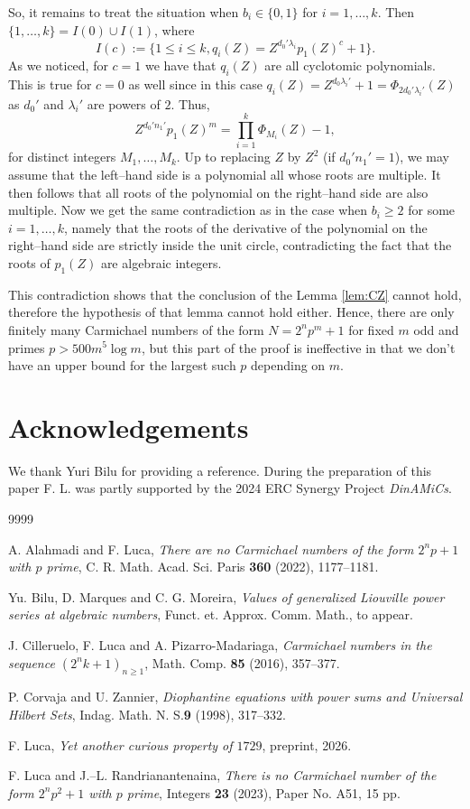 \documentclass[11pt]{article}
\begin{document}
So, it remains to treat the situation when $b_i\in \{0,1\}$ for $i=1,\ldots,k$. Then $\{1,\ldots,k\}=I(0)\cup I(1)$, where 
$$
I(c):=\{1\le i\le k, q_i(Z)=Z^{d_0'\lambda_i} p_1(Z)^c+1\}.
$$ 
As we noticed, for $c=1$ we have that $q_i(Z)$ are all cyclotomic polynomials. This is true for $c=0$ as well since in this case $q_i(Z)=Z^{d_0\lambda_i'}+1=\Phi_{2d_0'\lambda_i'}(Z)$ as $d_0'$ and $\lambda_i'$ are powers of $2$. 
Thus, 
$$
Z^{d_0'n_1'}p_1(Z)^m=\prod_{i=1}^k \Phi_{M_i}(Z)-1,
$$
for distinct integers $M_1,\ldots,M_k$. Up to replacing $Z$ by $Z^2$ (if $d_0'n_1'=1$), we may assume that the left--hand side is a polynomial all whose roots are multiple. It then follows that all roots of the polynomial 
on the right--hand side are also multiple. Now we get the same contradiction as in  the case when $b_i\ge 2$ for some $i=1,\ldots,k$, namely that the roots of the derivative of the polynomial on the right--hand side are strictly inside the unit circle, contradicting the fact that the roots of $p_1(Z)$ are algebraic integers. 

This contradiction shows that the  conclusion of the Lemma \ref{lem:CZ} cannot hold, therefore the hypothesis of that lemma cannot hold either. Hence, there are only finitely many Carmichael numbers of the form $N=2^np^m+1$ for fixed $m$ odd and primes $p>500 m^5\log m$, but this part of the proof is ineffective in that we don't have an upper bound for the largest such $p$ depending on $m$.


\section{Acknowledgements}

We thank Yuri Bilu for providing a reference. During the preparation of this paper F. L. was partly supported by the 2024 ERC Synergy Project {\it DinAMiCs}. 


\begin{thebibliography}{9999}

  A. Alahmadi and F.  Luca, {\it There are no Carmichael numbers of the form $2^np+1$ with $p$ prime}, C. R. Math. Acad. Sci. Paris {\bf 360} (2022), 1177--1181.

 Yu. Bilu, D. Marques and C. G. Moreira, {\it Values of generalized Liouville power series at algebraic numbers}, Funct. et. Approx. Comm. Math., to appear. 

 J. Cilleruelo, F. Luca and A. Pizarro-Madariaga, {\it Carmichael numbers in the sequence $(2^nk+1)_{n\ge 1}$}, Math. Comp. {\bf 85} (2016),  357--377. 

 P. Corvaja and U. Zannier, {\it Diophantine equations with power sums and
Universal Hilbert Sets}, Indag. Math. N. S.{\bf 9} (1998), 317--332.

 F. Luca, {\it Yet another curious property of $1729$}, preprint, 2026. 

 F.  Luca and J.--L. Randrianantenaina, {\it There is no Carmichael number of the form $2^np^2+1$ with $p$ prime}, Integers {\bf 23} (2023), Paper No. A51, 15 pp.

\end{thebibliography}
\end{document}
